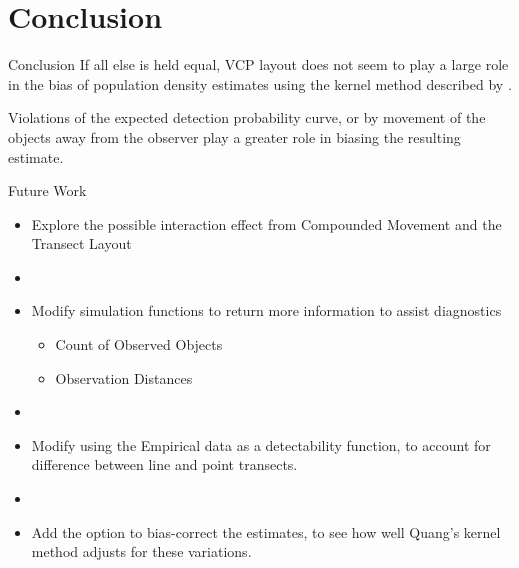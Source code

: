 \documentclass{beamer}
\begin{document}
\section{Conclusion}

\begin{frame}{Conclusion}
	If all else is held equal, VCP layout does not seem to play a large role in the bias of population density estimates using the kernel method described by \textcite{quang1993}.\par
		\vspace{1cm}
	Violations of the expected detection probability curve, or by movement of the objects away from the observer play a greater role in biasing the resulting estimate.
	
\end{frame}

\begin{frame}{Future Work}
	\begin{itemize}
	\item Explore the possible interaction effect from Compounded Movement and the Transect Layout
	\item[]
	\item Modify simulation functions to return more information to assist diagnostics
	\begin{itemize}
	\item Count of Observed Objects
	\item Observation Distances
	\end{itemize}
	\item[]
	\item Modify using the Empirical data as a detectability function, to account for difference between line and point transects.
	\item[]
	\item Add the option to bias-correct the estimates, to see how well Quang's kernel method adjusts for these variations.
	\end{itemize}
\end{frame}
\end{document}
